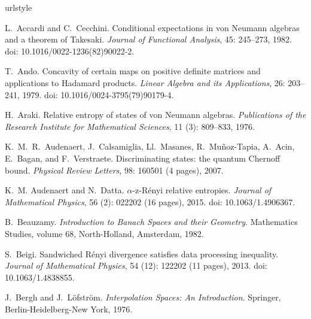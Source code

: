 \documentclass[12pt]{article}
\theoremstyle{definition}
\theoremstyle{remark}
\numberwithin{equation}{section}
\begin{document}
\begin{thebibliography}{27}
\providecommand{\url}[1]{\texttt{#1}}
\expandafter\ifx\csname urlstyle\endcsname\relax
  \providecommand{\doi}[1]{doi: #1}\else
  \providecommand{\doi}{doi: \begingroup \urlstyle{rm}\Url}\fi

L.~Accardi and C.~Cecchini.
\newblock Conditional expectations in von {Neumann} algebras and a theorem of
  {T}akesaki.
\newblock \emph{Journal of Functional Analysis}, 45: 245--273, 1982.
\newblock \doi{10.1016/0022-1236(82)90022-2}.

T.~Ando.
\newblock Concavity of certain maps on positive definite matrices and
  applications to {Hadamard} products.
\newblock \emph{Linear Algebra and its Applications}, 26: 203--241,
  1979.
\newblock \doi{10.1016/0024-3795(79)90179-4}.

H.~Araki.
\newblock Relative entropy of states of von {Neumann} algebras.
\newblock \emph{Publications of the Research Institute for Mathematical
  Sciences}, 11 (3): 809--833, 1976.

K.~M.~R.~Audenaert, J.~Calsamiglia, Ll.~Masanes, R.~Mu{\~n}oz-Tapia, A.~Acin, E.~Bagan,
and F.~Verstraete.
\newblock Discriminating states: the quantum Chernoff bound.
\newblock \emph{Physical Review Letters}, 98: 160501 (4 pages), 2007.

K.~M. Audenaert and N.~Datta.
\newblock $\alpha$-z-{R{\'e}nyi} relative entropies.
\newblock \emph{Journal of Mathematical Physics}, 56 (2):
022202 (16 pages), 2015.
\newblock \doi{10.1063/1.4906367}.

B.~Beauzamy.
\newblock \emph{Introduction to Banach Spaces and their Geometry}.
\newblock Mathematics Studies, volume 68, North-Holland, Amsterdam, 1982.

S.~Beigi.
\newblock Sandwiched {R{\'e}nyi} divergence satisfies data processing
  inequality.
\newblock \emph{Journal of Mathematical Physics}, 54 (12):
122202 (11 pages), 2013.
\newblock \doi{10.1063/1.4838855}.

J.~Bergh and J.~L\"ofstr\"om.
\newblock \emph{Interpolation Spaces: An Introduction}.
\newblock Springer, Berlin-Heidelberg-New York, 1976.


\end{thebibliography}
\end{document}
